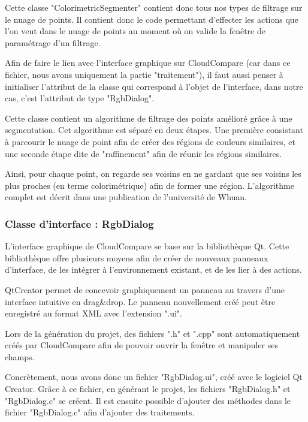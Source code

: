 \documentclass[12pt,titlepage,french]{article}
\begin{document}
Cette classe "ColorimetricSegmenter" contient donc tous nos types de filtrage sur le nuage de points. Il contient donc le code permettant d'effecter les actions que l'on veut dans le nuage de points au moment où on valide la fenêtre de paramétrage d'un filtrage. \newline

Afin de faire le lien avec l'interface graphique sur CloudCompare (car dans ce fichier, nous avons uniquement la partie "traitement"), il faut aussi penser à initialiser l'attribut de la classe qui correspond à l'objet de l'interface, dans notre cas, c'est l'attribut de type "RgbDialog".

Cette classe contient un algorithme de filtrage des points amélioré grâce à une segmentation. Cet algorithme est séparé en deux étapes. Une première consistant à parcourir le nuage de point afin de créer des régions de couleurs similaires, et une seconde étape dite de "raffinement" afin de réunir les régions similaires.

Ainsi, pour chaque point, on regarde ses voisins en ne gardant que ses voisins les plus proches (en terme colorimétrique) afin de former une région. L'algorithme complet est décrit dans une publication de l'université de \cite{B01} Whuan. 

\subsubsection{Classe d'interface : RgbDialog}

L'interface graphique de CloudCompare se base sur la bibliothèque Qt. Cette bibliothèque offre plusieurs moyens afin de créer de nouveaux panneaux d'interface, de les intégrer à l'environnement existant, et de les lier à des actions. \newline

QtCreator permet de concevoir graphiquement un panneau au travers d'une interface intuitive en drag\&drop. Le panneau nouvellement créé peut être enregistré au format XML avec l'extension ".ui". \newline

Lors de la génération du projet, des fichiers ".h" et ".cpp" sont automatiquement créés par CloudCompare afin de pouvoir ouvrir la fenêtre et manipuler ses champs. \newline

Concrètement, nous avons donc un fichier "RgbDialog.ui", créé avec le logiciel Qt Creator. Grâce à ce fichier, en générant le projet, les fichiers "RgbDialog.h" et "RgbDialog.c" se créent. Il est ensuite possible d'ajouter des méthodes dans le fichier "RgbDialog.c" afin d'ajouter des traitements.
\end{document}

